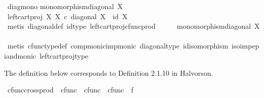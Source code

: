 \begin{isabellebody}
\ diag{\isacharunderscore}{\kern0pt}mono{\isacharcolon}{\kern0pt}\isanewline
{\isachardoublequoteopen}monomorphism{\isacharparenleft}{\kern0pt}diagonal\ X{\isacharparenright}{\kern0pt}{\isachardoublequoteclose}\isanewline
%
\isadelimproof
%
\endisadelimproof
%
\isatagproof
{}\isamarkupfalse%
\ {\isacharminus}{\kern0pt}\ \isanewline
\ \ \isamarkupfalse%
\ {\isachardoublequoteopen}left{\isacharunderscore}{\kern0pt}cart{\isacharunderscore}{\kern0pt}proj\ X\ X\ {\isasymcirc}\isactrlsub c\ diagonal\ X\ {\isacharequal}{\kern0pt}\ id\ X{\isachardoublequoteclose}\isanewline
\ \ \ \ \isamarkupfalse%
\ {\isacharparenleft}{\kern0pt}metis\ diagonal{\isacharunderscore}{\kern0pt}def\ id{\isacharunderscore}{\kern0pt}type\ left{\isacharunderscore}{\kern0pt}cart{\isacharunderscore}{\kern0pt}proj{\isacharunderscore}{\kern0pt}cfunc{\isacharunderscore}{\kern0pt}prod{\isacharparenright}{\kern0pt}\isanewline
\ \ \isamarkupfalse%
\ \isamarkupfalse%
\ {\isachardoublequoteopen}monomorphism{\isacharparenleft}{\kern0pt}diagonal\ X{\isacharparenright}{\kern0pt}{\isachardoublequoteclose}\isanewline
\ \ \ \ \isamarkupfalse%
\ {\isacharparenleft}{\kern0pt}metis\ cfunc{\isacharunderscore}{\kern0pt}type{\isacharunderscore}{\kern0pt}def\ comp{\isacharunderscore}{\kern0pt}monic{\isacharunderscore}{\kern0pt}imp{\isacharunderscore}{\kern0pt}monic\ diagonal{\isacharunderscore}{\kern0pt}type\ id{\isacharunderscore}{\kern0pt}isomorphism\ iso{\isacharunderscore}{\kern0pt}imp{\isacharunderscore}{\kern0pt}epi{\isacharunderscore}{\kern0pt}and{\isacharunderscore}{\kern0pt}monic\ left{\isacharunderscore}{\kern0pt}cart{\isacharunderscore}{\kern0pt}proj{\isacharunderscore}{\kern0pt}type{\isacharparenright}{\kern0pt}\isanewline
{}\isamarkupfalse%
%
\endisatagproof
{\isafoldproof}%
%
\isadelimproof
%
\endisadelimproof
%
\isadelimdocument
%
\endisadelimdocument
%
\isatagdocument
%
\isamarkuptrue%
%
\endisatagdocument
{\isafolddocument}%
%
\isadelimdocument
%
\endisadelimdocument
%
\begin{isamarkuptext}%
The definition below corresponds to Definition 2.1.10 in Halvorson.%
\end{isamarkuptext}\isamarkuptrue%
\isamarkupfalse%
\ cfunc{\isacharunderscore}{\kern0pt}cross{\isacharunderscore}{\kern0pt}prod\ {\isacharcolon}{\kern0pt}{\isacharcolon}{\kern0pt}\ {\isachardoublequoteopen}cfunc\ {\isasymRightarrow}\ cfunc\ {\isasymRightarrow}\ cfunc{\isachardoublequoteclose}\ {\isacharparenleft}{\kern0pt}\ {\isachardoublequoteopen}{\isasymtimes}\isactrlsub f{\isachardoublequoteclose}\ {}{}{\isacharparenright}{\kern0pt}\ \isanewline

\end{isabellebody}
